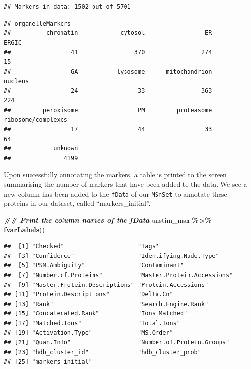 \documentclass[9pt,a4paper,]{extarticle}
\newenvironment{Shaded}{\begin{snugshade}}{\end{snugshade}}
\newcommand{\DocumentationTok}[1]{\textcolor[rgb]{0.56,0.35,0.01}{\textbf{\textit{#1}}}}
\newcommand{\FunctionTok}[1]{\textcolor[rgb]{0.13,0.29,0.53}{\textbf{#1}}}
\newcommand{\NormalTok}[1]{#1}
\newcommand{\SpecialCharTok}[1]{\textcolor[rgb]{0.81,0.36,0.00}{\textbf{#1}}}
\begin{document}
\begin{verbatim}
## Markers in data: 1502 out of 5701
\end{verbatim}

\begin{verbatim}
## organelleMarkers
##          chromatin            cytosol                 ER              ERGIC 
##                 41                370                274                 15 
##                 GA           lysosome      mitochondrion            nucleus 
##                 24                 33                363                224 
##         peroxisome                 PM         proteasome ribosome/complexes 
##                 17                 44                 33                 64 
##            unknown 
##               4199
\end{verbatim}

Upon successfully annotating the markers, a table is printed to the screen
summarising the number of markers that have been added to the data. We see a new
column has been added to the \texttt{fData} of our \texttt{MSnSet} to annotate these proteins
in our dataset, called ``markers\_initial''.

\begin{Shaded}
\begin{Highlighting}[]
\DocumentationTok{\#\# Print the column names of the fData}
\NormalTok{unstim\_msn }\SpecialCharTok{\%\textgreater{}\%}
  \FunctionTok{fvarLabels}\NormalTok{()}
\end{Highlighting}
\end{Shaded}

\begin{verbatim}
##  [1] "Checked"                     "Tags"                       
##  [3] "Confidence"                  "Identifying.Node.Type"      
##  [5] "PSM.Ambiguity"               "Contaminant"                
##  [7] "Number.of.Proteins"          "Master.Protein.Accessions"  
##  [9] "Master.Protein.Descriptions" "Protein.Accessions"         
## [11] "Protein.Descriptions"        "Delta.Cn"                   
## [13] "Rank"                        "Search.Engine.Rank"         
## [15] "Concatenated.Rank"           "Ions.Matched"               
## [17] "Matched.Ions"                "Total.Ions"                 
## [19] "Activation.Type"             "MS.Order"                   
## [21] "Quan.Info"                   "Number.of.Protein.Groups"   
## [23] "hdb_cluster_id"              "hdb_cluster_prob"           
## [25] "markers_initial"
\end{verbatim}
\end{document}
